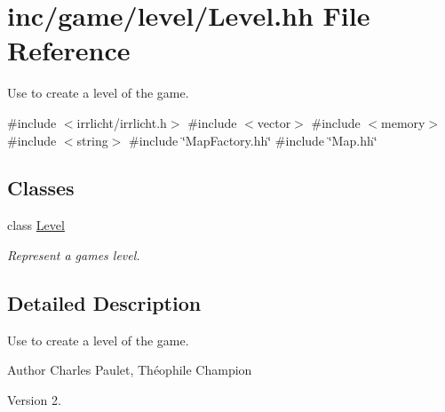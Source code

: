 \hypertarget{Level_8hh}{}\section{inc/game/level/\+Level.hh File Reference}
\label{Level_8hh}


Use to create a level of the game.  


{\ttfamily \#include $<$irrlicht/irrlicht.\+h$>$}\newline
{\ttfamily \#include $<$vector$>$}\newline
{\ttfamily \#include $<$memory$>$}\newline
{\ttfamily \#include $<$string$>$}\newline
{\ttfamily \#include \char`\"{}Map\+Factory.\+hh\char`\"{}}\newline
{\ttfamily \#include \char`\"{}Map.\+hh\char`\"{}}\newline
\subsection*{Classes}
\begin{DoxyCompactItemize}
\item 
class \hyperlink{classLevel}{Level}
\begin{DoxyCompactList}\small\item\em Represent a game\textquotesingle{}s level. \end{DoxyCompactList}\end{DoxyCompactItemize}


\subsection{Detailed Description}
Use to create a level of the game. 

\begin{DoxyAuthor}{Author}
Charles Paulet, Théophile Champion 
\end{DoxyAuthor}
\begin{DoxyVersion}{Version}
2. 
\end{DoxyVersion}

